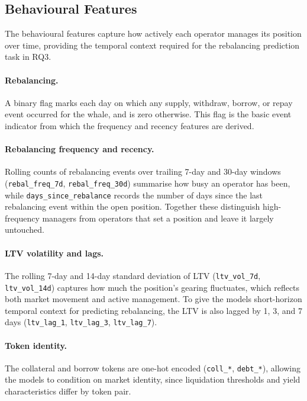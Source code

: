 \subsection{Behavioural Features}
\label{sec:behavioural-features}

The behavioural features capture how actively each operator manages its
position over time, providing the temporal context required for the
rebalancing prediction task in RQ3.

\paragraph{Rebalancing.}
A binary flag marks each day on which any supply, withdraw, borrow, or
repay event occurred for the whale, and is zero otherwise. This flag is
the basic event indicator from which the frequency and recency features
are derived.

\paragraph{Rebalancing frequency and recency.}
Rolling counts of rebalancing events over trailing 7-day and 30-day
windows (\texttt{rebal\_freq\_7d}, \texttt{rebal\_freq\_30d}) summarise
how busy an operator has been, while \texttt{days\_since\_rebalance}
records the number of days since the last rebalancing event within the
open position. Together these distinguish high-frequency managers from
operators that set a position and leave it largely untouched.

\paragraph{LTV volatility and lags.}
The rolling 7-day and 14-day standard deviation of LTV
(\texttt{ltv\_vol\_7d}, \texttt{ltv\_vol\_14d}) captures how much the
position's gearing fluctuates, which reflects both market movement and
active management. To give the models short-horizon temporal context for
predicting rebalancing, the LTV is also lagged by 1, 3, and 7 days
(\texttt{ltv\_lag\_1}, \texttt{ltv\_lag\_3}, \texttt{ltv\_lag\_7}).

\paragraph{Token identity.}
The collateral and borrow tokens are one-hot encoded
(\texttt{coll\_*}, \texttt{debt\_*}), allowing the models to condition on
market identity, since liquidation thresholds and yield characteristics
differ by token pair.

